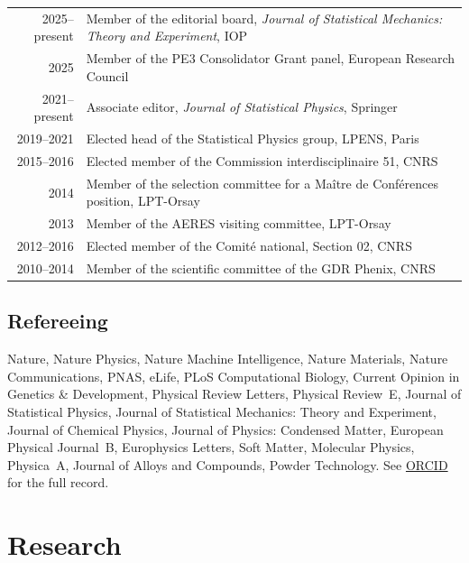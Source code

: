 \documentclass[a4paper,10pt]{article}
\begin{document}
\begin{tabularx}{\textwidth}{@{}D L@{}}
2025--present & Member of the editorial board, \emph{Journal of Statistical Mechanics: Theory and Experiment}, IOP \\
2025 & Member of the PE3 Consolidator Grant panel, European Research Council \\
2021--present & Associate editor, \emph{Journal of Statistical Physics}, Springer \\
2019--2021 & Elected head of the Statistical Physics group, LPENS, Paris \\
2015--2016 & Elected member of the Commission interdisciplinaire 51, CNRS \\
2014 & Member of the selection committee for a Maître de Conférences position, LPT-Orsay \\
2013 & Member of the AERES visiting committee, LPT-Orsay \\
2012--2016 & Elected member of the Comité national, Section 02, CNRS \\
2010--2014 & Member of the scientific committee of the GDR Phenix, CNRS \\
\end{tabularx}

\subsection{Refereeing}
\vspace{2pt}
{\small Nature, Nature Physics, Nature Machine Intelligence, Nature Materials, Nature Communications, PNAS, eLife,
PLoS Computational Biology, Current Opinion in Genetics \& Development, Physical Review Letters, Physical Review~E,
Journal of Statistical Physics, Journal of Statistical Mechanics: Theory and Experiment, Journal of Chemical Physics,
Journal of Physics: Condensed Matter, European Physical Journal~B, Europhysics Letters, Soft Matter, Molecular Physics,
Physica~A, Journal of Alloys and Compounds, Powder Technology.
See \href{https://orcid.org/0000-0001-9260-1951}{ORCID} for the full record.}

\section{Research}
\end{document}
